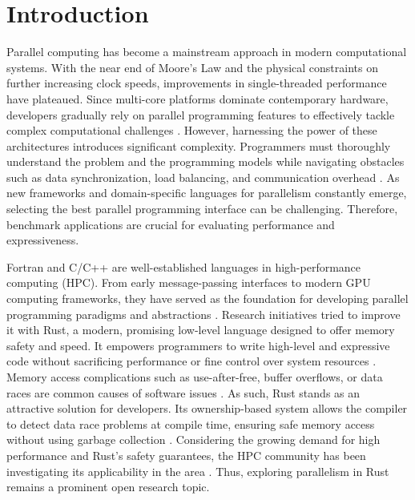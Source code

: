 
\section{Introduction}
Parallel computing has become a mainstream approach in modern computational systems. With the near end of Moore's Law and the physical constraints on further increasing clock speeds, improvements in single-threaded performance have plateaued. Since multi-core platforms dominate contemporary hardware, developers gradually rely on parallel programming features to effectively tackle complex computational challenges \cite{book_clock}. However, harnessing the power of these architectures introduces significant complexity. Programmers must thoroughly understand the problem and the programming models while navigating obstacles such as data synchronization, load balancing, and communication overhead \cite{book_introduction}. As new frameworks and domain-specific languages for parallelism constantly emerge, selecting the best parallel programming interface can be challenging. Therefore, benchmark applications are crucial for evaluating performance and expressiveness.

Fortran and C/C++ are well-established languages in high-performance computing (HPC). From early message-passing interfaces to modern GPU computing frameworks, they have served as the foundation for developing parallel programming paradigms and abstractions \cite{amaral2020programming, alrawais2021parallel}. Research initiatives tried to improve it with Rust, a modern, promising low-level language designed to offer memory safety and speed. It empowers programmers to write high-level and expressive code without sacrificing performance or fine control over system resources \cite{rustbook}. Memory access complications such as use-after-free, buffer overflows, or data races are common causes of software issues \cite{membug2camb, membug3narure}. As such, Rust stands as an attractive solution for developers. Its ownership-based system allows the compiler to detect data race problems at compile time, ensuring safe memory access without using garbage collection \cite{rustbook}. Considering the growing demand for high performance and Rust's safety guarantees, the HPC community has been investigating its applicability in the area \cite{PIEPER:COLA:21}. Thus, exploring parallelism in Rust remains a prominent open research topic. 

